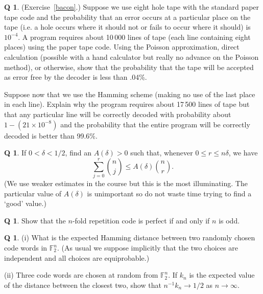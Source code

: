 \documentclass[12pt,a4paper]{article}
\theoremstyle{plain}
\theoremstyle{definition}
\newtheorem{question}[theorem]{Q}
\begin{document}
\begin{question}\label{C2.4}
(Exercise~\ref{bacon}.)
Suppose we use eight hole tape with
the standard paper tape code
and the probability that an error occurs at a particular
place on the tape (i.e. a hole occurs where it should
not or fails to occur where it should) is $10^{-4}$.
A program requires about 10\,000 lines of tape
(each line containing eight places)
using the paper tape code. Using
the Poisson approximation, direct calculation
(possible with a hand calculator but really no
advance on the Poisson method), or otherwise,
show that the probability that the tape
will be accepted as error free by the decoder
is less than .04\%.

Suppose now that we use the Hamming scheme
(making no use of the last place in each line).
Explain why the program requires about
17\,500 lines of tape but that any
particular line will be correctly decoded
with probability about $1-(21\times 10^{-8})$
and the probability that the entire program
will be correctly decoded is better than
99.6\%.
\end{question}
\begin{question}\label{C2.5} 
If $0<\delta<1/2$,
find an $A(\delta)>0$ such that, whenever
$0\leq r\leq n\delta$, we have
\[\sum_{j=0}^{r}\binom{n}{j}\leq A(\delta)\binom{n}{r}.\]
(We use weaker estimates in the course but this is
the most illuminating. The particular value of $A(\delta)$
is unimportant so do not waste time trying to find
a `good' value.)
\end{question}
\begin{question}\label{C2.6}
Show that the $n$-fold repetition code
is perfect if and only if $n$ is odd.
\end{question}
\begin{question}\label{C2.7} 
(i) What is the expected Hamming distance
between two randomly chosen code words in ${\mathbb F}_{2}^{n}$.
(As usual we suppose implicitly that the two choices are independent
and all choices are equiprobable.)

(ii) Three code words are chosen at random 
from ${\mathbb F}_{2}^{n}$. If $k_{n}$ is
the expected value of the distance between the
closest two,
show that $n^{-1}k_{n}\rightarrow 1/2$ as
$n\rightarrow\infty$. 

\end{question}
\end{document}
